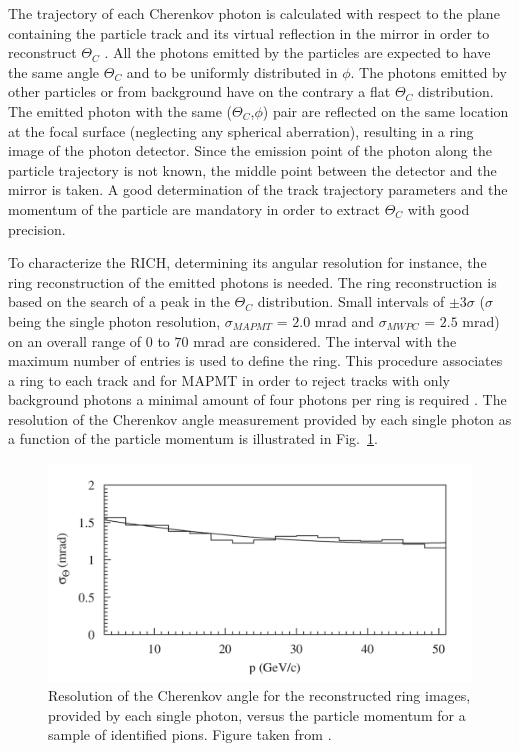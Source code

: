 The trajectory of each Cherenkov photon is calculated with respect to the plane containing the particle track and its virtual reflection in the mirror in order to reconstruct $\Theta_C$ \cite{RICHTheory}. All the photons emitted by the particles are expected to have the same angle $\Theta_C$ and to be uniformly distributed in $\phi$. The photons emitted by other particles or from background have on the contrary a flat $\Theta_C$ distribution. The emitted photon with the same ($\Theta_C$,$\phi$) pair are reflected on the same location at the focal surface (neglecting any spherical aberration), resulting in a ring image of the photon detector. Since the emission point of the photon along the particle trajectory is not known, the middle point between the detector and the mirror is taken. A good determination of the track trajectory parameters and the momentum of the particle are mandatory in order to extract $\Theta_C$ with good precision.

To characterize the RICH, determining its angular resolution for instance, the ring reconstruction of the emitted photons is needed. The ring reconstruction is based on the search of a peak in the $\Theta_C$ distribution. Small intervals of $\pm$3$\sigma$ ($\sigma$ being the single photon resolution, $\sigma_{MAPMT}$ = $2.0$ mrad and $\sigma_{MWPC}$ = $2.5$ mrad) on an overall range of $0$ to $70$ mrad are considered. The interval with the maximum number of entries is used to define the ring. This procedure associates a ring to each track and for MAPMT in order to reject tracks with only background photons a minimal amount of four photons per ring is required \cite{RICHPID}. The resolution of the Cherenkov angle measurement provided by each single photon as a function of the particle momentum is illustrated in Fig.~\ref{pic:RICHRez}.

\begin{figure}[!h]
  \centering
	\includegraphics[scale=0.5]{./gfx/RICHRez.png}
	\caption{Resolution of the Cherenkov angle for the reconstructed ring images, provided by each single photon, versus the particle momentum for a sample of identified pions. Figure taken from \cite{NIM}.}
	\label{pic:RICHRez}
\end{figure}

